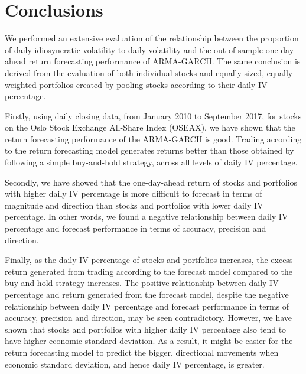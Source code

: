 
\chapter{Conclusions}
\label{Conclusions}

We performed an extensive evaluation of the relationship between the proportion of daily idiosyncratic volatility to daily volatility and the out-of-sample one-day-ahead return forecasting performance of ARMA-GARCH. The same conclusion is derived from the evaluation of both individual stocks and equally sized, equally weighted portfolios created by pooling stocks according to their daily IV percentage. 

Firstly, using daily closing data, from January 2010 to September 2017, for stocks on the Oslo Stock Exchange All-Share Index (OSEAX), we have shown that the return forecasting performance of the ARMA-GARCH is good. Trading according to the return forecasting model generates returns better than those obtained by following a simple buy-and-hold strategy, across all levels of daily IV percentage.

Secondly, we have showed that the one-day-ahead return of stocks and portfolios with higher daily IV percentage is more difficult to forecast in terms of magnitude and direction than stocks and portfolios with lower daily IV percentage. In other words, we found a negative relationship between daily IV percentage and forecast performance in terms of accuracy, precision and direction.

Finally, as the  daily IV percentage of stocks and portfolios increases, the excess return generated from trading according to the forecast model compared to the buy and hold-strategy increases. The positive relationship between daily IV percentage and return generated from the forecast model, despite the negative relationship between daily IV percentage and forecast performance in terms of accuracy, precision and direction, may be seen contradictory. However, we have shown that stocks and portfolios with higher daily IV percentage also tend to have higher economic standard deviation. As a result, it might be easier for the return forecasting model to predict the bigger, directional movements when economic standard deviation, and hence daily IV percentage, is greater. 